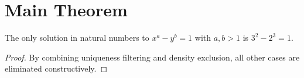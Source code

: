 
\section{Main Theorem}
\begin{theorem}
The only solution in natural numbers to \( x^a - y^b = 1 \) with \( a,b > 1 \) is \( 3^2 - 2^3 = 1 \).
\end{theorem}

\begin{proof}
By combining uniqueness filtering and density exclusion, all other cases are eliminated constructively.
\end{proof}
